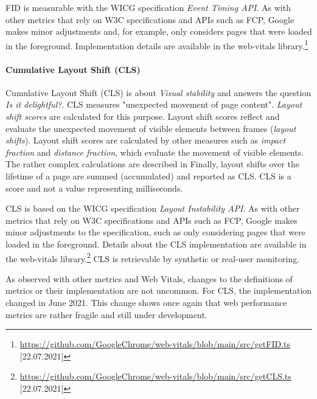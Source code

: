 FID is measurable with the WICG specification \textit{Event Timing API}.
As with other metrics that rely on W3C specifications and APIs such as FCP, Google makes minor adjustments and, for example, only considers pages that were loaded in the foreground.
Implementation details are available in the web-vitals library.\footnote{\url{https://github.com/GoogleChrome/web-vitals/blob/main/src/getFID.ts} [22.07.2021]}


\paragraph{Cumulative Layout Shift (CLS)} %

Cumulative Layout Shift (CLS) is about \textit{Visual stability} and answers the question \textit{Is it delightful?}.
CLS measures "unexpected movement of page content".
\textit{Layout shift scores} are calculated for this purpose.
Layout shift scores reflect and evaluate the unexpected movement of visible elements between frames (\textit{layout shifts}).
Layout shift scores are calculated by other measures such as \textit{impact fraction} and \textit{distance fraction}, which evaluate the movement of visible elements.
The rather complex calculations are described in %
Finally, layout shifts over the lifetime of a page are summed (accumulated) and reported as CLS.
CLS is a score and not a value representing milliseconds.

CLS is based on the WICG specification \textit{Layout Instability API}.
As with other metrics that rely on W3C specifications and APIs such as FCP, Google makes minor adjustments to the specification, such as only considering pages that were loaded in the foreground.
Details about the CLS implementation are available in the web-vitals library.\footnote{\url{https://github.com/GoogleChrome/web-vitals/blob/main/src/getCLS.ts} [22.07.2021]}
CLS is retrievable by synthetic or real-user monitoring.


As observed with other metrics and Web Vitals, changes to the definitions of metrics or their implementation are not uncommon.
For CLS, the implementation changed in June 2021. %
This change shows once again that web performance metrics are rather fragile and still under development.



